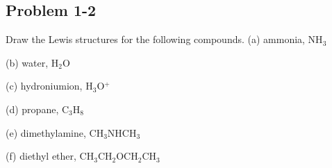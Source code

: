 \documentclass{article}[11pt]
\begin{document}
\subsection{Problem 1-2}
\label{sec:ch1p2}
\noindent
Draw the Lewis structures for the following compounds.
\newline
\newline
(a) ammonia, NH$_{3}$
\newline
\newline
\begin{center}  \end{center}
\newline
\newline
(b) water, H$_{2}$O
\newline
\newline
\begin{center}  \end{center}
\newline
\newline
(c) hydroniumion, H$_{3}$O$^{+}$
\newline
\newline
\begin{center}  \end{center}
\newline
\newline
(d) propane, C$_{3}$H$_{8}$
\newline
\newline
\begin{center}  \end{center}
\newline
\newline
(e) dimethylamine, CH$_{3}$NHCH$_{3}$
\newline
\newline
\begin{center}  \end{center}
\newline
\newline
(f) diethyl ether, CH$_{3}$CH$_{2}$OCH$_{2}$CH$_{3}$
\newline
\newline
\begin{center}  \end{center}
\end{document}

